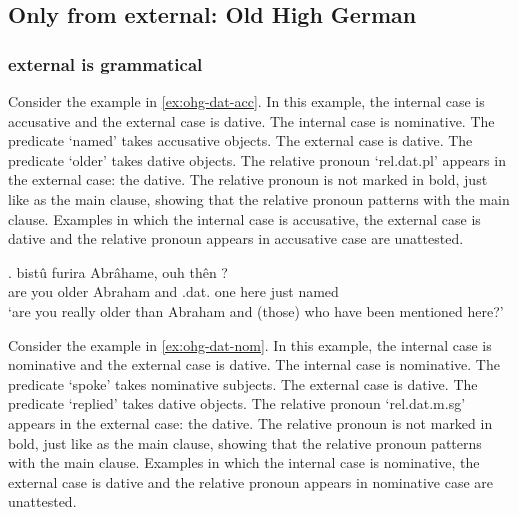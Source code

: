  \subsection{Only from external: Old High German}


  \subsubsection{external is grammatical}


Consider the example in \ref{ex:ohg-dat-acc}. In this example, the internal case is accusative and the external case is dative.
The internal case is nominative. The predicate  `named' takes accusative objects.
The external case is dative. The predicate  `older' takes dative objects.
The relative pronoun  `\ac{rel}.\ac{dat}.\ac{pl}' appears in the external case: the dative. The relative pronoun is not marked in bold, just like as the main clause, showing that the relative pronoun patterns with the main clause.
Examples in which the internal case is accusative, the external case is dative and the relative pronoun appears in accusative case are unattested.

\exg. bistû furira Abrâhame, ouh thên    ?\\
 {are you} older\scsub{[dat]} {Abraham} and .\ac{dat}. one here just named\scsub{[acc]}\\
 `are you really older than Abraham and (those) who have been mentioned here?' \label{ex:ohg-dat-acc}



Consider the example in \ref{ex:ohg-dat-nom}. In this example, the internal case is nominative and the external case is dative.
The internal case is nominative. The predicate  `spoke' takes nominative subjects.
The external case is dative. The predicate  `replied' takes dative objects.
The relative pronoun  `\ac{rel}.\ac{dat}.\ac{m}.\ac{sg}' appears in the external case: the dative. The relative pronoun is not marked in bold, just like as the main clause, showing that the relative pronoun patterns with the main clause.
Examples in which the internal case is nominative, the external case is dative and the relative pronoun appears in nominative case are unattested.

